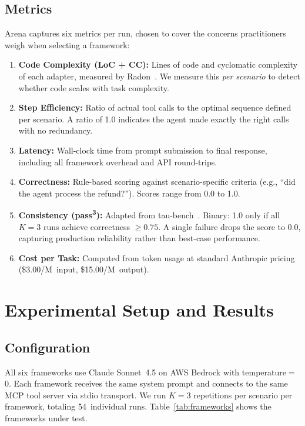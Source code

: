 \documentclass[sigconf]{acmart}
\begin{document}
\subsection{Metrics}

Arena captures six metrics per run, chosen to cover the concerns practitioners weigh when selecting a framework:

\begin{enumerate}[leftmargin=*,nosep]
  \item \textbf{Code Complexity (LoC + CC):} Lines of code and cyclomatic complexity of each adapter, measured by Radon~\cite{radon}. We measure this \emph{per scenario} to detect whether code scales with task complexity.
  \item \textbf{Step Efficiency:} Ratio of actual tool calls to the optimal sequence defined per scenario. A ratio of 1.0 indicates the agent made exactly the right calls with no redundancy.
  \item \textbf{Latency:} Wall-clock time from prompt submission to final response, including all framework overhead and API round-trips.
  \item \textbf{Correctness:} Rule-based scoring against scenario-specific criteria (e.g., ``did the agent process the refund?''). Scores range from 0.0 to 1.0.
  \item \textbf{Consistency (pass\textsuperscript{3}):} Adapted from tau-bench~\cite{taubench}. Binary: 1.0 only if all $K{=}3$ runs achieve correctness $\geq 0.75$. A single failure drops the score to 0.0, capturing production reliability rather than best-case performance.
  \item \textbf{Cost per Task:} Computed from token usage at standard Anthropic pricing (\$3.00/M~input, \$15.00/M~output).
\end{enumerate}

\section{Experimental Setup and Results}

\subsection{Configuration}

All six frameworks use Claude Sonnet~4.5 on AWS Bedrock with temperature$=$0. Each framework receives the same system prompt and connects to the same MCP tool server via stdio transport. We run $K{=}3$ repetitions per scenario per framework, totaling 54~individual runs. Table~\ref{tab:frameworks} shows the frameworks under test.
\end{document}
